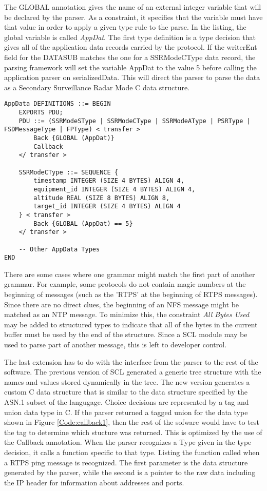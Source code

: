 \documentclass[12pt,oneside,letterpaper]{article}
\begin{document}
The GLOBAL annotation gives the name of an external integer variable that will be declared by the parser. As a constraint, it specifies that the variable must have that value in order to apply a given type rule to the parse. In the listing, the global variable is called \textit{AppDat}. The first type definition is a type decision that gives all of the application data records carried by the protocol. If the writerEnt field for the DATASUB matches the one for a SSRModeCType data record, the parsing framework will set the variable AppDat to the value 5 before calling the application parser on serializedData. This will direct the parser to parse the data as a Secondary Surveillance Radar Mode C data structure.

\begin{lstlisting}[language=SCL2,style=mystyle,frame=none,
caption=Example of Global Specification,label=Code:global, xleftmargin=3.5ex]
AppData DEFINITIONS ::= BEGIN
    EXPORTS PDU;
    PDU ::= (SSRModeSType | SSRModeCType | SSRModeAType | PSRType | FSDMessageType | FPType) < transfer >
        Back {GLOBAL (AppDat)}
        Callback
    </ transfer >

    SSRModeCType ::= SEQUENCE {
        timestamp INTEGER (SIZE 4 BYTES) ALIGN 4,
        equipment_id INTEGER (SIZE 4 BYTES) ALIGN 4,
        altitude REAL (SIZE 8 BYTES) ALIGN 8,
        target_id INTEGER (SIZE 4 BYTES) ALIGN 4
    } < transfer >
        Back {GLOBAL (AppDat) == 5}
    </ transfer >
    
    -- Other AppData Types
END
\end{lstlisting}

There are some cases where one grammar might match the first part of another grammar. For example, some protocols do not contain magic numbers at the beginning of messages (such as the 'RTPS' at the beginning of RTPS messages). Since there are no direct clues, the beginning of an NFS message might be matched as an NTP message. To minimize this, the constraint \textit{All Bytes Used} may be added to structured types to indicate that all of the bytes in the current buffer must be used by the end of the structure. Since a SCL module may be used to parse part of another message, this is left to developer control.

The last extension has to do with the interface from the parser to the rest of the software. The previous version of SCL generated a generic tree structure with the names and values stored dynamically in the tree. The new version generates a custom C data structure that is similar to the data structure specified by the ASN.1 subset of the langugage. Choice decisions are represented by a tag and union data type in C. If the parser returned a  tagged union for the data type shown in Figure \ref{Code:callback1}, then the rest of the sofware would have to test the tag to determine which stucture was returned. This is optimized by the use of the Callback annotation. When the parser recognizes a Type given in the type decision, it calls a function specific to that type. Listing  the function called when a RTPS ping message is recognized. The first parameter is the data structure generated by the parser, while the second is a pointer to the raw data including the IP header for information about addresses and ports.
\end{document}
